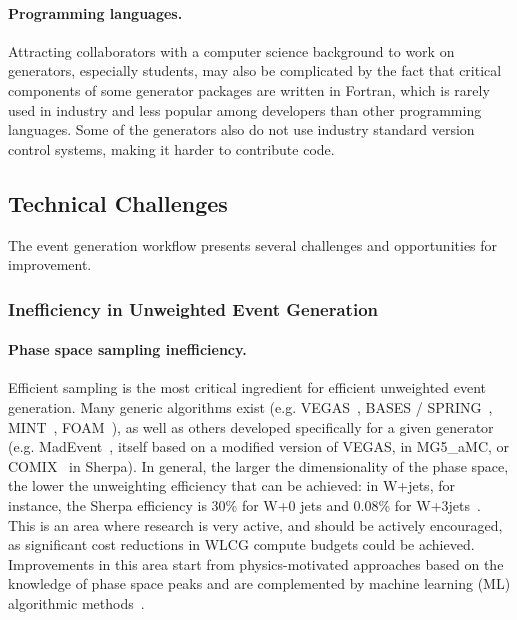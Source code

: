 \paragraph{Programming languages.} Attracting collaborators with a computer
science background to work on generators, especially students, may also
be complicated by the fact that critical components of some generator
packages are written in Fortran, which is rarely used in industry and
less popular among developers than other programming languages. Some of
the generators also do not use industry standard version control
systems, making it harder to contribute code.

\hypertarget{technical-challenges-software-and-computing}{%
\subsection{Technical Challenges}\label{technical-challenges-software-and-computing}}

The event generation workflow presents several challenges and
opportunities for improvement.

\subsubsection{Inefficiency in Unweighted Event Generation}

\paragraph{Phase space sampling inefficiency.} Efficient sampling is the most
critical ingredient for efficient unweighted event generation. Many
generic algorithms exist (e.g. VEGAS~\cite{Lep80}, BASES / SPRING~\cite{Kaw86}, 
MINT~\cite{Nas07}, FOAM~\cite{Jad03}), as well as others
developed specifically for a given generator (e.g. MadEvent~\cite{Mal03},
itself based on a modified version of VEGAS, in MG5\_aMC, or COMIX~\cite{Gle08} 
in Sherpa). In general, the larger the dimensionality of the
phase space, the lower the unweighting efficiency that can be achieved:
in W+jets, for instance, the Sherpa efficiency is 30\% for W+0 jets and
0.08\% for W+3jets~\cite{Gao20}. This is an area where research is very
active, and should be actively encouraged, as significant cost
reductions in WLCG compute budgets could be achieved. Improvements in
this area start from physics-motivated approaches based on the
knowledge of phase space peaks and are complemented by
machine learning (ML) algorithmic methods~\cite{Ben17,Bot20,Gao20,Kli18}.

